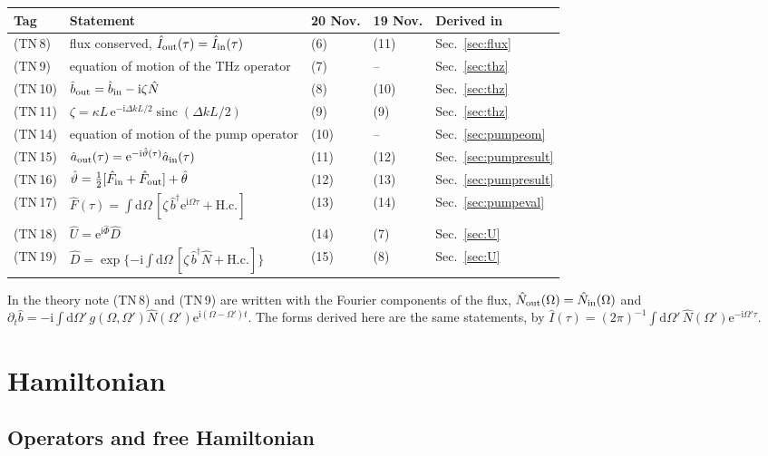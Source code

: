 \documentclass[aps,pra,onecolumn,notitlepage,11pt,amsmath,amssymb,nofootinbib]{revtex4-2}
\newcommand{\Nop}{\hat N}
\newcommand{\Iop}{\hat I}
\newcommand{\dd}{\mathrm{d}}
\newcommand{\ee}{\mathrm{e}}
\newcommand{\ii}{\mathrm{i}}
\newcommand{\sinc}{\operatorname{sinc}}
\begin{document}
\begin{center}
\begin{tabular}{R{0.10\textwidth}R{0.44\textwidth}R{0.10\textwidth}R{0.10\textwidth}R{0.15\textwidth}}
\hline\hline
Tag & Statement & 20 Nov. & 19 Nov. & Derived in\\
\hline
(TN\,8) & flux conserved, $\Iop_{\rm out}(\tau)=\Iop_{\rm in}(\tau)$ & (6) & (11) & Sec.~\ref{sec:flux}\\
(TN\,9) & equation of motion of the THz operator & (7) & -- & Sec.~\ref{sec:thz}\\
(TN\,10) & $\hat b_{\rm out}=\hat b_{\rm in}-\ii\zeta\Nop$ & (8) & (10) & Sec.~\ref{sec:thz}\\
(TN\,11) & $\zeta=\kappa L\,\ee^{-\ii\Delta kL/2}\sinc(\Delta kL/2)$ & (9) & (9) & Sec.~\ref{sec:thz}\\
(TN\,14) & equation of motion of the pump operator & (10) & -- & Sec.~\ref{sec:pumpeom}\\
(TN\,15) & $\hat a_{\rm out}(\tau)=\ee^{-\ii\hat\vartheta(\tau)}\hat a_{\rm in}(\tau)$ & (11) & (12) & Sec.~\ref{sec:pumpresult}\\
(TN\,16) & $\hat\vartheta=\tfrac12[\hat F_{\rm in}+\hat F_{\rm out}]+\hat\theta$ & (12) & (13) & Sec.~\ref{sec:pumpresult}\\
(TN\,17) & $\hat F(\tau)=\int\dd\Omega\,[\zeta\,\hat b^\dagger\ee^{\ii\Omega\tau}+\mathrm{H.c.}]$ & (13) & (14) & Sec.~\ref{sec:pumpeval}\\
(TN\,18) & $\hat U=\ee^{\ii\hat\Phi}\hat D$ & (14) & (7) & Sec.~\ref{sec:U}\\
(TN\,19) & $\hat D=\exp\{-\ii\int\dd\Omega\,[\zeta\,\hat b^\dagger\Nop+\mathrm{H.c.}]\}$ & (15) & (8) & Sec.~\ref{sec:U}\\
\hline\hline
\end{tabular}
\end{center}

In the theory note (TN\,8) and (TN\,9) are written with the Fourier
components of the flux, $\Nop_{\rm out}(\Omega)=\Nop_{\rm in}(\Omega)$ and
$\partial_t\hat b=-\ii\int\dd\Omega'\,g(\Omega,\Omega')\Nop(\Omega')\ee^{\ii(\Omega-\Omega')t}$.
The forms derived here are the same statements, by
$\Iop(\tau)=(2\pi)^{-1}\int\dd\Omega'\,\Nop(\Omega')\ee^{-\ii\Omega'\tau}$.

\section{Hamiltonian}
\label{sec:H}

\subsection{Operators and free Hamiltonian}
\end{document}
